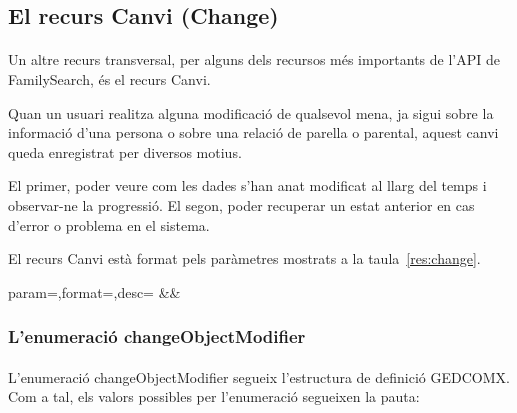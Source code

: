 \subsection{El recurs Canvi (Change)}

    \paragraph{}
    Un altre recurs transversal, per alguns dels recursos més importants de l'API de FamilySearch, és el recurs Canvi.

    Quan un usuari realitza alguna modificació de qualsevol mena, ja sigui sobre la informació d'una persona o sobre una relació de parella o parental, aquest canvi queda enregistrat per diversos motius.

    El primer, poder veure com les dades s'han anat modificat al llarg del temps i observar-ne la progressió. El segon, poder recuperar un estat anterior en cas d'error o problema en el sistema.

    El recurs Canvi està format pels paràmetres mostrats a la taula~\ref{res:change}.

    \begin{center}
             {param=\param,format=\format,desc=\desc}
             {\param&\format&\desc}
     \end{center}


     \subsubsection{L'enumeració changeObjectModifier}

     \paragraph{}
     L'enumeració changeObjectModifier segueix l'estructura de definició GEDCOMX. Com a tal, els valors possibles per l'enumeració segueixen la pauta:

